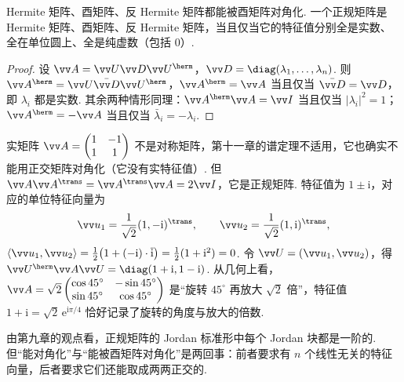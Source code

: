 	\begin{corollary}\label{cor:normalclasses}
		Hermite 矩阵、酉矩阵、反 Hermite 矩阵都能被酉矩阵对角化. 一个正规矩阵是 Hermite 矩阵、酉矩阵、反 Hermite 矩阵，当且仅当它的特征值分别全是实数、全在单位圆上、全是纯虚数（包括 $0$）.
	\end{corollary}
	\begin{proof}
		设 $\vv A=\vv U\vv D\vv U^\herm$，$\vv D=\diag(\lambda_1,\ldots,\lambda_n)$. 则 $\vv A^\herm=\vv U\bar{\vv D}\vv U^\herm$，$\vv A^\herm=\vv A$ 当且仅当 $\bar{\vv D}=\vv D$，即 $\lambda_i$ 都是实数. 其余两种情形同理：$\vv A^\herm\vv A=\vv I$ 当且仅当 $|\lambda_i|^2=1$；$\vv A^\herm=-\vv A$ 当且仅当 $\bar\lambda_i=-\lambda_i$.
	\end{proof}
	
	\begin{example}
		实矩阵 $\vv A=\begin{pmatrix}1&-1\\1&1\end{pmatrix}$ 不是对称矩阵，第十一章的谱定理不适用，它也确实不能用正交矩阵对角化（它没有实特征值）. 但 $\vv A\vv A^\trans=\vv A^\trans\vv A=2\vv I$，它是正规矩阵. 特征值为 $1\pm\mathrm i$，对应的单位特征向量为
		\[\vv u_1=\frac1{\sqrt2}(1,-\mathrm i)^\trans,\qquad\vv u_2=\frac1{\sqrt2}(1,\mathrm i)^\trans,\]
		$\langle\vv u_1,\vv u_2\rangle=\frac12\big(1+(-\mathrm i)\cdot\overline{\mathrm i}\big)=\frac12(1+\mathrm i^2)=0$. 令 $\vv U=(\vv u_1,\vv u_2)$，得 $\vv U^\herm\vv A\vv U=\diag(1+\mathrm i,1-\mathrm i)$. 从几何上看，$\vv A=\sqrt2\begin{pmatrix}\cos45^\circ&-\sin45^\circ\\\sin45^\circ&\cos45^\circ\end{pmatrix}$ 是“旋转 $45^\circ$ 再放大 $\sqrt2$ 倍”，特征值 $1+\mathrm i=\sqrt2\,\mathrm e^{\mathrm i\pi/4}$ 恰好记录了旋转的角度与放大的倍数.
	\end{example}
	
	由第九章的观点看，正规矩阵的 Jordan 标准形中每个 Jordan 块都是一阶的. 但“能对角化”与“能被酉矩阵对角化”是两回事：前者要求有 $n$ 个线性无关的特征向量，后者要求它们还能取成两两正交的.
	
